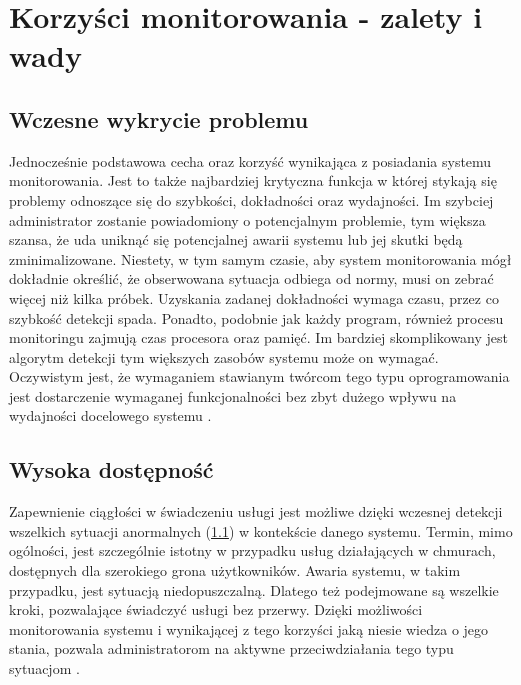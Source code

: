 \section{Korzyści monitorowania - zalety i wady}
\label{chapter:monitoring:advantages}

    \subsection{Wczesne wykrycie problemu}
    \label{chapter:monitoring:advantages:early_detection}
    Jednocześnie podstawowa cecha oraz korzyść wynikająca z posiadania systemu monitorowania. 
    Jest to także najbardziej krytyczna funkcja w której stykają się problemy odnoszące się
    do szybkości, dokładności oraz wydajności. Im szybciej administrator zostanie
    powiadomiony o potencjalnym problemie, tym większa szansa, że uda uniknąć się potencjalnej
    awarii systemu lub jej skutki będą zminimalizowane. Niestety, w tym samym czasie, 
    aby system monitorowania mógł dokładnie określić, że obserwowana sytuacja odbiega od normy,
    musi on zebrać więcej niż kilka próbek. Uzyskania zadanej dokładności wymaga czasu, 
    przez co szybkość detekcji spada. Ponadto, podobnie jak każdy program, również procesu
    monitoringu zajmują czas procesora oraz pamięć. Im bardziej skomplikowany jest algorytm
    detekcji tym większych zasobów systemu może on wymagać. Oczywistym jest, że wymaganiem
    stawianym twórcom tego typu oprogramowania jest dostarczenie wymaganej funkcjonalności
    bez zbyt dużego wpływu na wydajności docelowego systemu \cite{monitoring_and_alerting}. 
    
    \subsection{Wysoka dostępność}
    \label{chapter:monitoring:advantages:high_availability}
    Zapewnienie ciągłości w świadczeniu usługi jest możliwe dzięki wczesnej detekcji
    wszelkich sytuacji anormalnych (\ref{chapter:monitoring:advantages:early_detection}) w kontekście danego systemu. 
    Termin, mimo ogólności, jest szczególnie istotny w przypadku usług działających w chmurach, dostępnych
    dla szerokiego grona użytkowników. Awaria systemu, w takim przypadku, jest sytuacją niedopuszczalną. Dlatego
    też podejmowane są wszelkie kroki, pozwalające świadczyć usługi bez przerwy. Dzięki możliwości
    monitorowania systemu i wynikającej z tego korzyści jaką niesie wiedza o jego stania, pozwala
    administratorom na aktywne przeciwdziałania tego typu sytuacjom \cite{monitoring_and_alerting}. 
    
